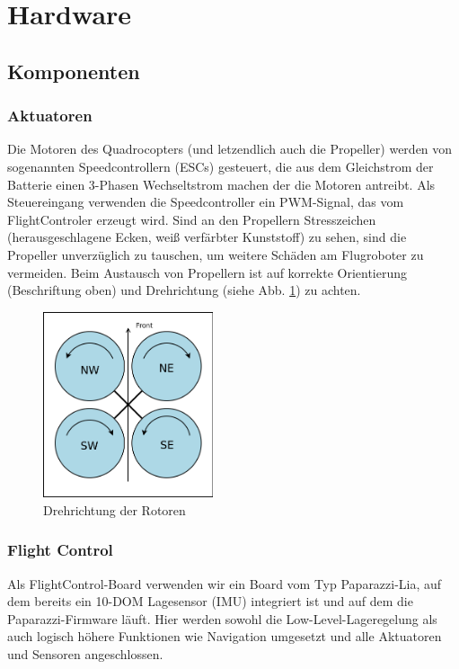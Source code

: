 \section{Hardware}

\subsection{Komponenten}
\subsubsection{Aktuatoren}

Die Motoren des Quadrocopters (und letzendlich auch die Propeller) werden von sogenannten Speedcontrollern (ESCs) gesteuert, die aus dem Gleichstrom der Batterie einen 3-Phasen Wechseltstrom machen der die Motoren antreibt.
Als Steuereingang verwenden die Speedcontroller ein PWM-Signal, das vom FlightControler erzeugt wird.
Sind an den Propellern Stresszeichen (herausgeschlagene Ecken, weiß verfärbter Kunststoff) zu sehen, sind die Propeller unverzüglich zu tauschen, um weitere Schäden am Flugroboter zu vermeiden.
Beim Austausch von Propellern ist auf korrekte Orientierung (Beschriftung oben) und Drehrichtung (siehe Abb. \ref{drehrichtung}) zu achten.

\begin{figure}[h]
	\centering
	\includegraphics[width=5cm]{img/drehrichtung}
	\caption{Drehrichtung der Rotoren}
	\label{drehrichtung}

\end{figure}


\subsubsection{Flight Control}

Als FlightControl-Board verwenden wir ein Board vom Typ Paparazzi-Lia, auf dem bereits ein 10-DOM Lagesensor (IMU) integriert ist und auf dem die Paparazzi-Firmware läuft. Hier werden sowohl die Low-Level-Lageregelung als auch logisch höhere Funktionen wie Navigation umgesetzt und alle Aktuatoren und Sensoren angeschlossen.

